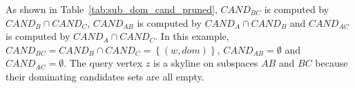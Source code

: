 As shown in Table~\ref{tab:sub_dom_cand_pruned}, $\mathit{CAND}_{BC}$ is computed by $\mathit{CAND}_{B} \cap \mathit{CAND}_{C}$, $\mathit{CAND}_{AB}$ is computed by $\mathit{CAND}_{A} \cap \mathit{CAND}_{B}$ and $\mathit{CAND}_{AC}$ is computed by $\mathit{CAND}_{A} \cap \mathit{CAND}_{C}$. In this example, $\mathit{CAND}_{BC} = \mathit{CAND}_B \cap \mathit{CAND}_C = \left\{(w, dom)\right\}$, $\mathit{CAND}_{AB} = \emptyset$ and $\mathit{CAND}_{AC} = \emptyset$.
The query vertex $z$ is a skyline on subspaces $AB$ and $BC$ because their dominating candidates sets are all empty.
